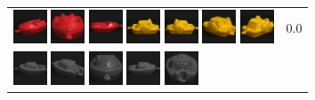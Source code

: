 \begin{figure}[tbp]
\begin{center}
\begin{tabular}{m{11cm} | m{3cm} |}
\includegraphics[width=1cm]{coil/beeld-21.eps}
\includegraphics[width=1cm]{coil/beeld-20.eps}
\includegraphics[width=1cm]{coil/beeld-19.eps}
\includegraphics[width=1cm]{coil/beeld-12.eps}
\includegraphics[width=1cm]{coil/beeld-13.eps}
\includegraphics[width=1cm]{coil/beeld-16.eps}
\includegraphics[width=1cm]{coil/beeld-15.eps}
& {\scriptsize 0.0}
\\
\includegraphics[width=1cm]{coil/beeld-24.eps}
\includegraphics[width=1cm]{coil/beeld-25.eps}
\includegraphics[width=1cm]{coil/beeld-28.eps}
\includegraphics[width=1cm]{coil/beeld-27.eps}
\includegraphics[width=1cm]{coil/beeld-26.eps}

\end{tabular}
\end{center}
\end{figure}
